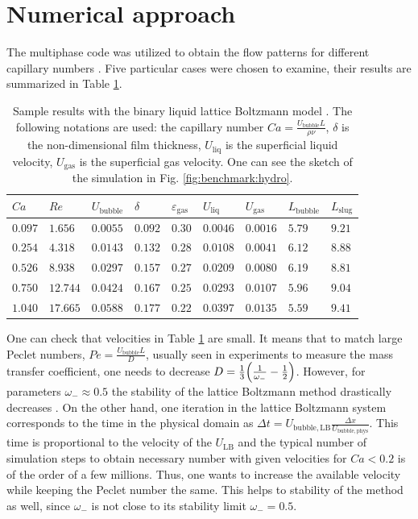 \documentclass{article}
\newcommand{\lbubble}{L_{\mathrm{bubble}}}
\newcommand{\lslug}{L_{\mathrm{slug}}}
\newcommand{\ububble}{U_{\mathrm{bubble}}}
\newcommand{\uliq}{U_{\mathrm{liq}}}
\newcommand{\ugas}{U_{\mathrm{gas}}}
\newcommand{\omegaminus}{\omega_{-}}
\newcommand{\holdup}{\varepsilon_{\mathrm{gas}}}
\begin{document}
\section{Numerical approach}
\label{sec:numerics}
The multiphase code was utilized to obtain the flow patterns for different capillary numbers
\cite{kuzmin-binary2d}. Five particular cases were chosen to examine, their results are summarized
in Table \ref{table:capillary:cases}. 
\begin{table}[htb!]
\begin{tabularx}{\textwidth}{|X|X|X|X|X|X|X|X|X|}
\hline
$Ca$    &$Re$     &$\ububble$ &$\delta$&$\holdup$
&$\uliq$&$\ugas$&$\lbubble$&$\lslug$\\
\hline
$0.097$ &$1.656$  &$0.0055$ &$0.092$ &$0.30$ &$0.0046$&$0.0016$&$5.79$&$9.21$\\ 
$0.254$ &$4.318$  &$0.0143$ &$0.132$ &$0.28$ &$0.0108$&$0.0041$&$6.12$&$8.88$\\ 
$0.526$ &$8.938$  &$0.0297$ &$0.157$ &$0.27$ &$0.0209$&$0.0080$&$6.19$&$8.81$\\
$0.750$ &$12.744$ &$0.0424$ &$0.167$ &$0.25$ &$0.0293$&$0.0107$&$5.96$&$9.04$\\
$1.040$ &$17.665$ &$0.0588$ &$0.177$ &$0.22$ &$0.0397$&$0.0135$&$5.59$&$9.41$\\
\hline
\end{tabularx}
\caption{Sample results with the binary liquid lattice Boltzmann model \cite{kuzmin-binary2d}. The
following notations are used: the capillary number $Ca=\frac{\ububble L}{\rho \nu}$, $\delta$ is the
non-dimensional film thickness, $\uliq$ is the superficial liquid velocity, $\ugas$ is the
superficial gas velocity. One can see the sketch of the simulation in Fig.
\ref{fig:benchmark:hydro}. \label{table:capillary:cases}}
\end{table}
One can check that velocities in Table \ref{table:capillary:cases} are small. It means that to
match large Peclet numbers, $Pe=\frac{\ububble L}{D}$, usually seen in experiments to measure
the mass transfer coefficient, one needs to decrease
$D=\frac{1}{3}\Bigl(\frac{1}{\omegaminus}-\frac{1}{2}\Bigr)$. However, for parameters
$\omegaminus \approx 0.5$ the stability of the lattice Boltzmann method drastically decreases
\cite{kuzmin-d1q3}. On the other hand, one iteration in the lattice Boltzmann system corresponds
to the time in the physical domain as $\Delta t=U_{\mathrm{bubble,LB}} \frac{\Delta
x}{U_{\mathrm{bubble,phys}}}$. This time is proportional to the velocity of the $U_{\mathrm{LB}}$
and the typical number of simulation steps to obtain necessary number with given velocities for
$Ca<0.2$ is of the order of a few millions. Thus, one wants to increase the available velocity
while keeping the Peclet number the same. This helps to stability of the method as well, since
$\omegaminus$ is not close to its stability limit $\omegaminus=0.5$. 
\end{document}

